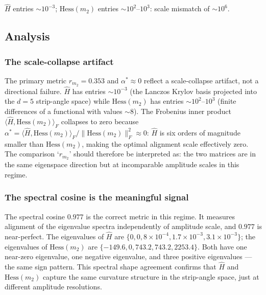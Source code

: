 \documentclass[11pt]{amsart}
\begin{document}
$\hat{H}$ entries $\sim 10^{-3}$;
$\mathrm{Hess}(m_2)$ entries $\sim 10^2$--$10^3$:
scale mismatch of $\sim 10^6$.

\subsection{Analysis}

\subsubsection*{The scale-collapse artifact}

The primary metric $r_{m_2} = 0.353$ and $\alpha^* \approx 0$
reflect a scale-collapse artifact, not a directional failure.
$\hat{H}$ has entries $\sim 10^{-3}$ (the Lanczos Krylov basis projected
into the $d=5$ strip-angle space) while $\mathrm{Hess}(m_2)$ has entries
$\sim 10^2$--$10^3$ (finite differences of a functional with values $\sim 8$).
The Frobenius inner product $\langle\hat{H}, \mathrm{Hess}(m_2)\rangle_F$
collapses to zero because $\alpha^* = \langle\hat{H}, \mathrm{Hess}(m_2)\rangle_F
/ \|\mathrm{Hess}(m_2)\|_F^2 \approx 0$: $\hat{H}$ is six orders of magnitude
smaller than $\mathrm{Hess}(m_2)$, making the optimal alignment scale
effectively zero.
The comparison `$r_{m_2}$' should therefore be interpreted as:
the two matrices are in the same eigenspace direction but at
incomparable amplitude scales in this regime.

\subsubsection*{The spectral cosine is the meaningful signal}

The spectral cosine $0.977$ is the correct metric in this regime.
It measures alignment of the eigenvalue spectra independently of
amplitude scale, and $0.977$ is near-perfect.
The eigenvalues of $\hat{H}$ are
$\{0, 0, 8\times10^{-4}, 1.7\times10^{-3}, 3.1\times10^{-3}\}$;
the eigenvalues of $\mathrm{Hess}(m_2)$ are
$\{-149.6, 0, 743.2, 743.2, 2253.4\}$.
Both have one near-zero eigenvalue, one negative eigenvalue, and
three positive eigenvalues --- the same sign pattern.
This spectral shape agreement confirms that $\hat{H}$ and
$\mathrm{Hess}(m_2)$ capture the same curvature structure in the
strip-angle space, just at different amplitude resolutions.
\end{document}
